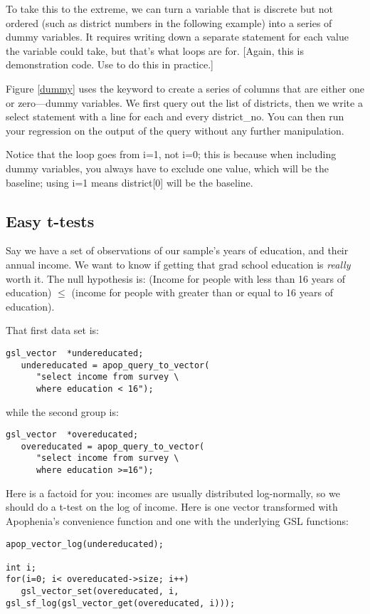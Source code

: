 To take this to the extreme, we can turn a variable that is discrete
but not ordered (such as district numbers in the following example)
into a series of dummy variables. It requires writing down a separate
 statement for each value the variable could take, but
that's what  loops are for.  [Again, this is demonstration
code. Use  to do this in practice.]


Figure \ref{dummy} uses the  keyword to create a series of
columns that are either one or zero---dummy variables.  We first query
out the list of districts, then we write a select statement with a line
 for each and
every district\_no. You can then run your regression on the output of
the query without any further manipulation.

Notice that the  loop goes from i=1, not i=0; this is because when
including dummy variables, you always have to exclude one value, which
will be the baseline; using i=1 means district[0] will be the baseline.

\subsection{Easy t-tests}
Say we have a set of observations of our sample's years of education,
and their annual income. We want to know if getting that grad school
education is {\it really} worth it. The null hypothesis is: (Income for
people with less than 16 years of education) $\leq$ (income for people
with greater than or equal to 16 years of education).

That first data set is:
\begin{lstlisting}
gsl_vector	*undereducated;
   undereducated = apop_query_to_vector(
      "select income from survey \
      where education < 16");
\end{lstlisting}
while the second group is:
\begin{lstlisting}
gsl_vector	*overeducated;
   overeducated = apop_query_to_vector(
      "select income from survey \
      where education >=16");
\end{lstlisting}

Here is a factoid for you: incomes are usually distributed log-normally, so we should do a t-test on the
log of income. Here is one  vector transformed with Apophenia's convenience function and one with the underlying GSL functions: 
\begin{lstlisting}
apop_vector_log(undereducated);

int i;
for(i=0; i< overeducated->size; i++)
   gsl_vector_set(overeducated, i, gsl_sf_log(gsl_vector_get(overeducated, i)));
\end{lstlisting}

